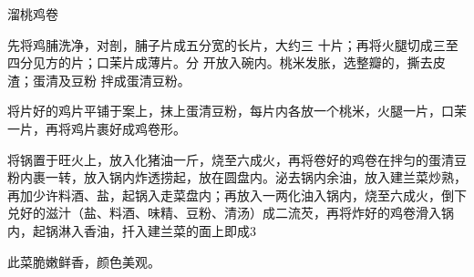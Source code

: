 \begin{recipe}{溜桃鸡卷}

\ingredients



\cooking

先将鸡脯洗净，对剖，脯子片成五分宽的长片，大约三 十片；再将火腿切成三至四分见方的片；口茉片成薄片。分 开放入碗内。桃米发胀，选整瓣的，撕去皮渣；蛋清及豆粉 拌成蛋清豆粉。

\step 将片好的鸡片平铺于案上，抹上蛋清豆粉，每片内各放一个桃米，火腿一片，口茉一片，再将鸡片裹好成鸡卷形。

\step 将锅置于旺火上，放入化猪油一斤，烧至六成火，再将卷好的鸡卷在拌匀的蛋清豆粉内裹一转，放入锅内炸透捞起，放在圆盘内。泌去锅内余油，放入建兰菜炒熟，再加少许料酒、盐，起锅入走菜盘内；再放入一两化油入锅内，烧至六成火，倒下兑好的滋汁（盐、料酒、味精、豆粉、清汤）成二流芡，再将炸好的鸡卷滑入锅内，起锅淋入香油，扦入建兰菜的面上即成3

\notes

此菜脆嫩鲜香，颜色美观。

\end{recipe}

